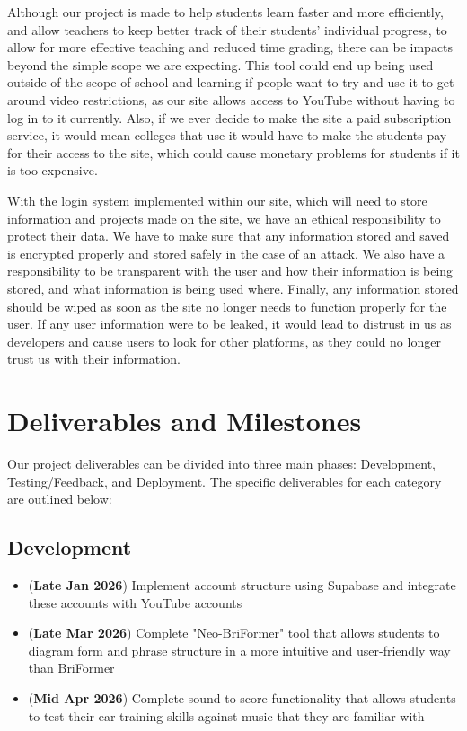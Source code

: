 \documentclass[12pt, letterpaper]{article}
\begin{document}
Although our project is made to help students learn faster and more efficiently, and allow teachers to keep better track of their students' individual progress, to allow for more effective teaching and reduced time grading, there can be impacts beyond the simple scope we are expecting. This tool could end up being used outside of the scope of school and learning if people want to try and use it to get around video restrictions, as our site allows access to YouTube without having to log in to it currently. Also, if we ever decide to make the site a paid subscription service, it would mean colleges that use it would have to make the students pay for their access to the site, which could cause monetary problems for students if it is too expensive.

With the login system implemented within our site, which will need to store information and projects made on the site, we have an ethical responsibility to protect their data. We have to make sure that any information stored and saved is encrypted properly and stored safely in the case of an attack. We also have a responsibility to be transparent with the user and how their information is being stored, and what information is being used where. Finally, any information stored should be wiped as soon as the site no longer needs to function properly for the user. If any user information were to be leaked, it would lead to distrust in us as developers and cause users to look for other platforms, as they could no longer trust us with their information.

\section*{Deliverables and Milestones}
Our project deliverables can be divided into three main phases: Development, Testing/Feedback, and Deployment.  The specific deliverables for each category are outlined below:

\subsection*{Development}
\begin{itemize}[label=$\square$]
    \item[$\checkmark$] (\textbf{Late Jan 2026}) Implement account structure using Supabase and integrate these accounts with YouTube accounts 
    \item[$\checkmark$] (\textbf{Late Mar 2026}) Complete "Neo-BriFormer" tool that allows students to diagram form and phrase structure in a more intuitive and user-friendly way than BriFormer
    \item[$\checkmark$] (\textbf{Mid Apr 2026}) Complete sound-to-score functionality that allows students to test their ear training skills against music that they are familiar with
\end{itemize}
\end{document}
